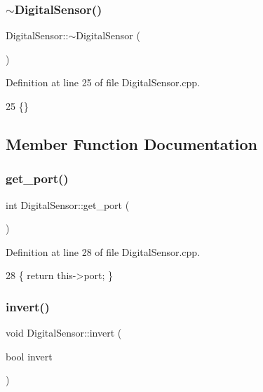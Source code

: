\subsubsection{\texorpdfstring{$\sim$\+Digital\+Sensor()}{~DigitalSensor()}}
{\footnotesize\ttfamily Digital\+Sensor\+::$\sim$\+Digital\+Sensor (\begin{DoxyParamCaption}{ }\end{DoxyParamCaption})}



Definition at line 25 of file Digital\+Sensor.\+cpp.


\begin{DoxyCode}
25 \{\}
\end{DoxyCode}


\subsection{Member Function Documentation}
\mbox{\label{class_digital_sensor_a9957b8be49aaa4dc417db3ccbcdf3956}} 
\subsubsection{\texorpdfstring{get\+\_\+port()}{get\_port()}}
{\footnotesize\ttfamily int Digital\+Sensor\+::get\+\_\+port (\begin{DoxyParamCaption}{ }\end{DoxyParamCaption})}



Definition at line 28 of file Digital\+Sensor.\+cpp.


\begin{DoxyCode}
28 \{ \textcolor{keywordflow}{return} this->port; \}
\end{DoxyCode}
\mbox{\label{class_digital_sensor_a1e6784022a127dd543bbfcc4f69c4802}} 
\subsubsection{\texorpdfstring{invert()}{invert()}}
{\footnotesize\ttfamily void Digital\+Sensor\+::invert (\begin{DoxyParamCaption}\item[{bool}]{invert }\end{DoxyParamCaption})}



